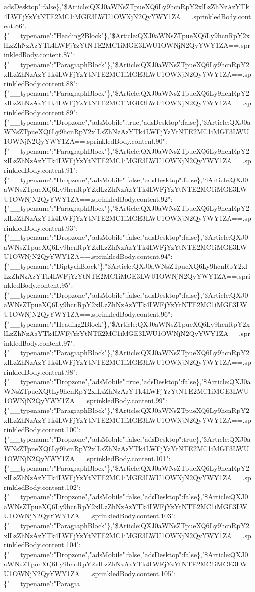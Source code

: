 adsDesktop":false\},"\$Article:QXJ0aWNsZTpueXQ6Ly9hcnRpY2xlLzZhNzAzYTk4LWFjYzYtNTE2MC1iMGE3LWU1OWNjN2QyYWY1ZA==.sprinkledBody.content.86":\{"\_\_typename":"Heading2Block"\},"\$Article:QXJ0aWNsZTpueXQ6Ly9hcnRpY2xlLzZhNzAzYTk4LWFjYzYtNTE2MC1iMGE3LWU1OWNjN2QyYWY1ZA==.sprinkledBody.content.87":\{"\_\_typename":"ParagraphBlock"\},"\$Article:QXJ0aWNsZTpueXQ6Ly9hcnRpY2xlLzZhNzAzYTk4LWFjYzYtNTE2MC1iMGE3LWU1OWNjN2QyYWY1ZA==.sprinkledBody.content.88":\{"\_\_typename":"ParagraphBlock"\},"\$Article:QXJ0aWNsZTpueXQ6Ly9hcnRpY2xlLzZhNzAzYTk4LWFjYzYtNTE2MC1iMGE3LWU1OWNjN2QyYWY1ZA==.sprinkledBody.content.89":\{"\_\_typename":"Dropzone","adsMobile":true,"adsDesktop":false\},"\$Article:QXJ0aWNsZTpueXQ6Ly9hcnRpY2xlLzZhNzAzYTk4LWFjYzYtNTE2MC1iMGE3LWU1OWNjN2QyYWY1ZA==.sprinkledBody.content.90":\{"\_\_typename":"ParagraphBlock"\},"\$Article:QXJ0aWNsZTpueXQ6Ly9hcnRpY2xlLzZhNzAzYTk4LWFjYzYtNTE2MC1iMGE3LWU1OWNjN2QyYWY1ZA==.sprinkledBody.content.91":\{"\_\_typename":"Dropzone","adsMobile":false,"adsDesktop":false\},"\$Article:QXJ0aWNsZTpueXQ6Ly9hcnRpY2xlLzZhNzAzYTk4LWFjYzYtNTE2MC1iMGE3LWU1OWNjN2QyYWY1ZA==.sprinkledBody.content.92":\{"\_\_typename":"ParagraphBlock"\},"\$Article:QXJ0aWNsZTpueXQ6Ly9hcnRpY2xlLzZhNzAzYTk4LWFjYzYtNTE2MC1iMGE3LWU1OWNjN2QyYWY1ZA==.sprinkledBody.content.93":\{"\_\_typename":"Dropzone","adsMobile":false,"adsDesktop":false\},"\$Article:QXJ0aWNsZTpueXQ6Ly9hcnRpY2xlLzZhNzAzYTk4LWFjYzYtNTE2MC1iMGE3LWU1OWNjN2QyYWY1ZA==.sprinkledBody.content.94":\{"\_\_typename":"DiptychBlock"\},"\$Article:QXJ0aWNsZTpueXQ6Ly9hcnRpY2xlLzZhNzAzYTk4LWFjYzYtNTE2MC1iMGE3LWU1OWNjN2QyYWY1ZA==.sprinkledBody.content.95":\{"\_\_typename":"Dropzone","adsMobile":false,"adsDesktop":false\},"\$Article:QXJ0aWNsZTpueXQ6Ly9hcnRpY2xlLzZhNzAzYTk4LWFjYzYtNTE2MC1iMGE3LWU1OWNjN2QyYWY1ZA==.sprinkledBody.content.96":\{"\_\_typename":"Heading2Block"\},"\$Article:QXJ0aWNsZTpueXQ6Ly9hcnRpY2xlLzZhNzAzYTk4LWFjYzYtNTE2MC1iMGE3LWU1OWNjN2QyYWY1ZA==.sprinkledBody.content.97":\{"\_\_typename":"ParagraphBlock"\},"\$Article:QXJ0aWNsZTpueXQ6Ly9hcnRpY2xlLzZhNzAzYTk4LWFjYzYtNTE2MC1iMGE3LWU1OWNjN2QyYWY1ZA==.sprinkledBody.content.98":\{"\_\_typename":"Dropzone","adsMobile":true,"adsDesktop":false\},"\$Article:QXJ0aWNsZTpueXQ6Ly9hcnRpY2xlLzZhNzAzYTk4LWFjYzYtNTE2MC1iMGE3LWU1OWNjN2QyYWY1ZA==.sprinkledBody.content.99":\{"\_\_typename":"ParagraphBlock"\},"\$Article:QXJ0aWNsZTpueXQ6Ly9hcnRpY2xlLzZhNzAzYTk4LWFjYzYtNTE2MC1iMGE3LWU1OWNjN2QyYWY1ZA==.sprinkledBody.content.100":\{"\_\_typename":"Dropzone","adsMobile":false,"adsDesktop":true\},"\$Article:QXJ0aWNsZTpueXQ6Ly9hcnRpY2xlLzZhNzAzYTk4LWFjYzYtNTE2MC1iMGE3LWU1OWNjN2QyYWY1ZA==.sprinkledBody.content.101":\{"\_\_typename":"ParagraphBlock"\},"\$Article:QXJ0aWNsZTpueXQ6Ly9hcnRpY2xlLzZhNzAzYTk4LWFjYzYtNTE2MC1iMGE3LWU1OWNjN2QyYWY1ZA==.sprinkledBody.content.102":\{"\_\_typename":"Dropzone","adsMobile":false,"adsDesktop":false\},"\$Article:QXJ0aWNsZTpueXQ6Ly9hcnRpY2xlLzZhNzAzYTk4LWFjYzYtNTE2MC1iMGE3LWU1OWNjN2QyYWY1ZA==.sprinkledBody.content.103":\{"\_\_typename":"ParagraphBlock"\},"\$Article:QXJ0aWNsZTpueXQ6Ly9hcnRpY2xlLzZhNzAzYTk4LWFjYzYtNTE2MC1iMGE3LWU1OWNjN2QyYWY1ZA==.sprinkledBody.content.104":\{"\_\_typename":"Dropzone","adsMobile":false,"adsDesktop":false\},"\$Article:QXJ0aWNsZTpueXQ6Ly9hcnRpY2xlLzZhNzAzYTk4LWFjYzYtNTE2MC1iMGE3LWU1OWNjN2QyYWY1ZA==.sprinkledBody.content.105":\{"\_\_typename":"Paragra